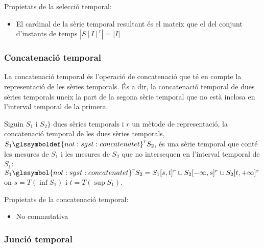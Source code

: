Propietats de la selecció temporal:
\begin{itemize}

\item El cardinal de la sèrie temporal resultant és el mateix que el
  del conjunt d'instants de temps $|S[I]^r| = |I|$

\end{itemize}




\subsubsection{Concatenació temporal}

La concatenació temporal és l'operació de concatenació que té en
compte la representació de les sèries temporals.  És a dir, la
concatenació temporal de dues sèries temporals uneix la part de la
segona sèrie temporal que no està inclosa en l'interval temporal de la
primera.


\begin{definition}
  Siguin $S_1$ i $S_2\}$ dues sèries temporals i $r$ un mètode de representació,
  la concatenació temporal de les dues sèries temporals, $S_1
  \glssymboldef{not:sgst:concatenatet}^r S_2$, és una sèrie temporal
  que conté les mesures de $S_1$ i les mesures de $S_2$ que no
  intersequen en l'interval temporal de $S_1$: $S_1
  \glssymbol{not:sgst:concatenatet}^r S_2 = S_1[s,t]^r \cup
  S_2[-\infty,s]^r \cup S_2[t,+\infty]^r$ on $s=T(\inf S_1)$ i
  $t=T(\sup S_1)$.
\end{definition}

Propietats de la concatenació temporal:
\begin{itemize}
\item No commutativa
\end{itemize}




\subsubsection{Junció temporal}


